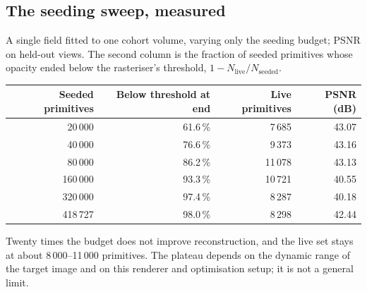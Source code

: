 \documentclass[11pt,a4paper]{article}
\begin{document}

\subsection{The seeding sweep, measured}\label{app:sweep}

A single field fitted to one cohort volume, varying only the seeding budget; PSNR on
held-out views. The second column is the fraction of seeded primitives whose opacity ended
below the rasteriser's threshold, $1 - N_{\mathrm{live}}/N_{\mathrm{seeded}}$.

\begin{center}
\begin{tabular}{rrrr}
\toprule
\textbf{Seeded primitives} & \textbf{Below threshold at end} & \textbf{Live primitives} &
\textbf{PSNR (dB)}\\
\midrule
20\,000  & 61.6\,\% & 7\,685  & 43.07\\
40\,000  & 76.6\,\% & 9\,373  & 43.16\\
80\,000  & 86.2\,\% & 11\,078 & 43.13\\
160\,000 & 93.3\,\% & 10\,721 & 40.55\\
320\,000 & 97.4\,\% & 8\,287  & 40.18\\
418\,727 & 98.0\,\% & 8\,298  & 42.44\\
\bottomrule
\end{tabular}
\end{center}

Twenty times the budget does not improve reconstruction, and the live set stays at about
8\,000--11\,000 primitives. The plateau depends on the dynamic range of the target image and
on this renderer and optimisation setup; it is not a general limit.

\end{document}
